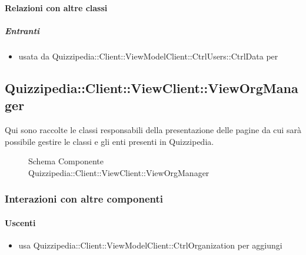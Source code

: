 \paragraph{Relazioni con altre classi}
\subparagraph{Entranti}
\begin{itemize}
\item usata da Quizzipedia::Client::ViewModelClient::CtrlUsers::CtrlData per 
\end{itemize}
\subsection{Quizzipedia::Client::ViewClient::ViewOrgManager}
Qui sono raccolte le classi responsabili della presentazione delle pagine da cui sarà possibile gestire le classi e gli enti presenti in Quizzipedia.
\begin{figure}[H]
\centering
\noindent{}
\caption[Schema Componente Quizzipedia::Client::ViewClient::ViewOrgManager]{Schema Componente Quizzipedia::Client::ViewClient::ViewOrgManager}
\end{figure}
\subsubsection{Interazioni con altre componenti}
\paragraph{Uscenti}
\begin{itemize}
\item usa Quizzipedia::Client::ViewModelClient::CtrlOrganization per aggiungi
\end{itemize}

